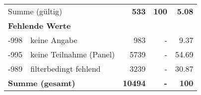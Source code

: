 \begin{longtable}{lXrrr}
     \midrule
     \multicolumn{2}{l}{Summe (gültig)} &
       \textbf{\num{533}} &
     \textbf{\num{100}} &
       \textbf{\num[round-mode=places,round-precision=2]{5.08}} \\
     \multicolumn{5}{l}{\textbf{Fehlende Werte}}\\
       -998 &
       keine Angabe &
         \num{983} &
        - &
         \num[round-mode=places,round-precision=2]{9.37} \\
       -995 &
       keine Teilnahme (Panel) &
         \num{5739} &
        - &
         \num[round-mode=places,round-precision=2]{54.69} \\
       -989 &
       filterbedingt fehlend &
         \num{3239} &
        - &
         \num[round-mode=places,round-precision=2]{30.87} \\
     \midrule
     \multicolumn{2}{l}{\textbf{Summe (gesamt)}} &
          \textbf{\num{10494}} &
        \textbf{-} &
        \textbf{\num{100}} \\
     \bottomrule
     \end{longtable}
     
